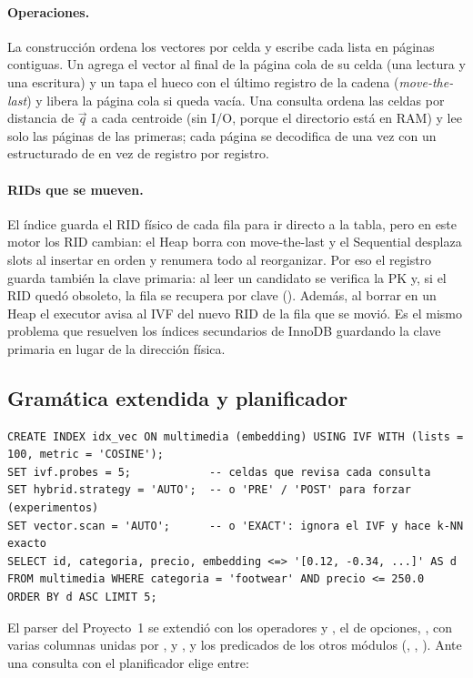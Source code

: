 \paragraph{Operaciones.} La construcción ordena los vectores por celda y escribe cada lista
en páginas contiguas. Un  agrega el vector al final de la página cola de su
celda (una lectura y una escritura) y un  tapa el hueco con el último registro
de la cadena (\emph{move-the-last}) y libera la página cola si queda vacía. Una consulta
ordena las celdas por distancia de $\vec q$ a cada centroide (sin I/O, porque el directorio
está en RAM) y lee solo las páginas de las  primeras; cada página se decodifica
de una vez con un  estructurado de  en vez de registro por
registro.

\paragraph{RIDs que se mueven.} El índice guarda el RID físico de cada fila para ir directo
a la tabla, pero en este motor los RID cambian: el Heap borra con move-the-last y el
Sequential desplaza slots al insertar en orden y renumera todo al reorganizar. Por eso el
registro guarda también la clave primaria: al leer un candidato se verifica la PK y, si el
RID quedó obsoleto, la fila se recupera por clave (). Además, al
borrar en un Heap el executor avisa al IVF del nuevo RID de la fila que se movió. Es el
mismo problema que resuelven los índices secundarios de InnoDB guardando la clave primaria
en lugar de la dirección física.

\subsection{Gramática extendida y planificador}

\begin{lstlisting}
CREATE INDEX idx_vec ON multimedia (embedding) USING IVF WITH (lists = 100, metric = 'COSINE');
SET ivf.probes = 5;            -- celdas que revisa cada consulta
SET hybrid.strategy = 'AUTO';  -- o 'PRE' / 'POST' para forzar (experimentos)
SET vector.scan = 'AUTO';      -- o 'EXACT': ignora el IVF y hace k-NN exacto
SELECT id, categoria, precio, embedding <=> '[0.12, -0.34, ...]' AS d
FROM multimedia WHERE categoria = 'footwear' AND precio <= 250.0
ORDER BY d ASC LIMIT 5;
\end{lstlisting}

El parser del Proyecto~1 se extendió con los operadores \code{<->} y \code{<=>}, el
 de opciones, ,  con varias
columnas unidas por ,  y , y los predicados de los
otros módulos (, , ). Ante una
consulta con  el planificador elige entre:

